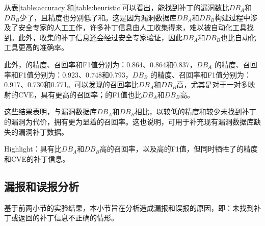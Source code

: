 从表\ref{table:accuracy}和\ref{table:heuristic}可以看出，\tool 能找到补丁的漏洞数比$DB_A$和$DB_B$少了，且精度也分别低了和。这是因为漏洞数据库$DB_A$和$DB_B$构建过程中涉及了安全专家的人工工作，许多补丁信息由人工收集得来，难以被自动化工具找到。此外，收集的补丁信息还会经过安全专家验证，因此$DB_A$和$DB_B$也比自动化工具更高的准确率。

此外，\tool 的精度、召回率和F1值分别为：0.864、0.864和0.837，$DB_A$ 的精度、召回率和F1值分别为：0.923、0.748和0.793，$DB_B$ 的精度、召回率和F1值分别为：0.917、0.730和0.771。可以发现\tool 的召回率比$DB_A$和$DB_B$高，尤其是对于一对多映射的CVE，\tool 具有更高的召回率；\tool 的F1值也比$DB_A$和$DB_B$高。

这些结果表明，与漏洞数据库$DB_A$和$DB_B$相比，\tool 以较低的精度和较少未找到补丁的漏洞为代价，拥有更为显着的召回率。这也说明，\tool 可用于补充现有漏洞数据库缺失的漏洞补丁数据。

\begin{tcolorbox}[size=title,opacityfill=0.15]
Highlight：\tool 具有比$DB_A$和$DB_B$高的召回率，以及高的F1值，但同时\tool 牺牲了的精度和CVE的补丁信息。
\end{tcolorbox}

\subsection{\tool 漏报和误报分析}\label{sec:fpfn}

基于前两小节的实验结果，本小节旨在分析造成\tool 漏报和误报的原因，即：\tool 未找到补丁或返回的补丁信息不正确的情形。

